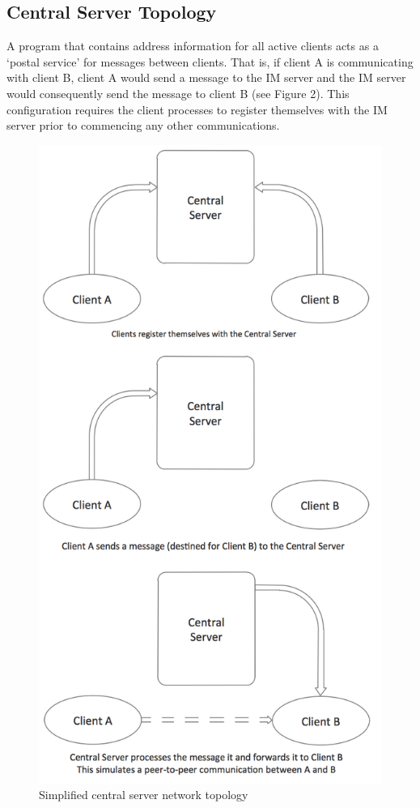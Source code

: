 \documentclass[a4paper, 12pt]{article}
\begin{document}
\subsection{Central Server Topology}
A program that contains address information for all active clients acts as a
`postal service' for messages between clients. That is, if client A is
communicating with client B, client A would send a message to the IM server
and the IM server would consequently send the message to client B (see Figure
2). This configuration requires the client processes to register themselves
with the IM server prior to commencing any other communications.
\begin{figure}
\centering
\includegraphics[scale=0.75]{central_server_topology}
\caption{Simplified central server network topology}
\end{figure}
\end{document}
